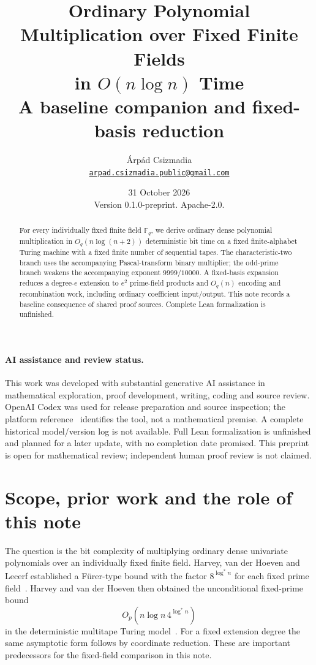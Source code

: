 \documentclass[11pt]{article}
\title{Ordinary Polynomial Multiplication over Fixed Finite Fields\\
  in $O(n\log n)$ Time\\
  \large A baseline companion and fixed-basis reduction}
\author{\'Arp\'ad Csizmadia\\
  \small\href{mailto:arpad.csizmadia.public@gmail.com}{\texttt{arpad.csizmadia.public@gmail.com}}}
\date{31 October 2026\\ \small Version 0.1.0-preprint. Apache-2.0.}
\newcommand{\F}{\mathbb F}
\begin{document}
\maketitle

\begin{abstract}
For every individually fixed finite field $\F_q$, we derive ordinary
dense polynomial multiplication in $O_q(n\log(n+2))$ deterministic bit
time on a fixed finite-alphabet Turing machine with a fixed finite
number of sequential tapes. The characteristic-two branch uses the
accompanying Pascal-transform binary multiplier; the odd-prime branch
weakens the accompanying exponent $9999/10000$. A fixed-basis expansion
reduces a degree-$e$ extension to $e^2$ prime-field products and
$O_q(n)$ encoding and recombination work, including ordinary coefficient
input/output. This note records a baseline consequence of shared proof
sources. Complete Lean formalization is unfinished.
\end{abstract}

\paragraph{AI assistance and review status.}
This work was developed with substantial generative AI assistance in
mathematical exploration, proof development, writing, coding and source
review. OpenAI Codex was used for release preparation and source
inspection; the platform reference~\cite{CodexPlatform} identifies the
tool, not a mathematical premise. A complete historical model/version
log is not available. Full Lean formalization is unfinished and planned
for a later update, with no completion date promised. This preprint is
open for mathematical review; independent human proof review is not claimed.

\section{Scope, prior work and the role of this note}
The question is the bit complexity of multiplying ordinary dense
univariate polynomials over an individually fixed finite field.
Harvey, van der Hoeven and Lecerf established a F\"urer-type bound
with the factor $8^{\log^* n}$ for each fixed prime
field~\cite{HVHL17}. Harvey and van der Hoeven then obtained the
unconditional fixed-prime bound
\[
 O_p\!\left(n\log n\,4^{\log^* n}\right)
\]
in the deterministic multitape Turing model~\cite[Theorem 1.1]{HVH19Cyclo}.
For a fixed extension degree the same asymptotic form follows by
coordinate reduction. These are important predecessors for the
fixed-field comparison in this note.
\end{document}
